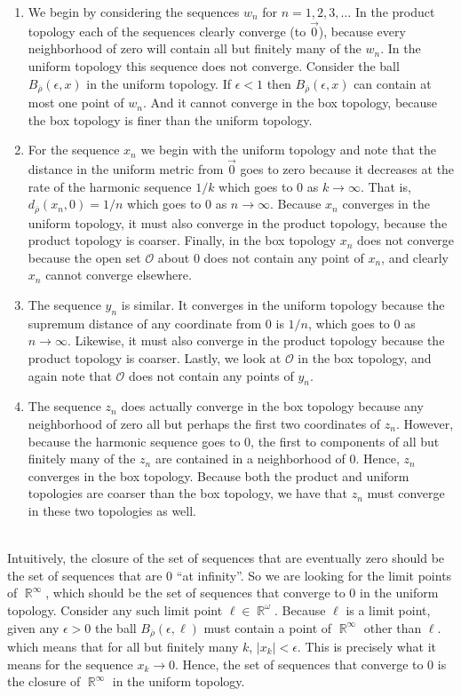 \documentclass{article}
\DeclareMathOperator{\R}{\mathbb{R}}
\newcommand{\problem}[1]{\noindent{\textbf{Problem #1}}\\}
\newcommand{\problempart}[1]{\noindent{\textbf{(#1)}}}
\begin{document}
\problempart{b} 
\begin{enumerate}
\item We begin by considering the sequences $w_n$ for $n = 1,2,3,\ldots$ In the product topology each of the sequences clearly converge (to $\vec{0}$), because every neighborhood of zero will contain all but finitely many of the $w_n$. In the uniform topology this sequence does not converge. Consider the ball $B_{\overline{\rho}}(\epsilon, x)$ in the uniform topology. If $\epsilon < 1$ then $B_{\overline{\rho}}(\epsilon, x)$ can contain at most one point of $w_n$. And it cannot converge in the box topology, because the box topology is finer than the uniform topology.
\item For the sequence $x_n$ we begin with the uniform topology and note that the distance in the uniform metric from $\vec{0}$ goes to zero because it decreases at the rate of the harmonic sequence $1/k$ which goes to 0 as $k \to \infty$. That is, $d_{\overline{\rho}}(x_n, 0) = 1/n$ which goes to 0 as $n \to \infty$. Because $x_n$ converges in the uniform topology, it must also converge in the product topology, because the product topology is coarser. Finally, in the box topology $x_n$ does not converge because the open set $\mathcal{O}$ about 0 does not contain any point of $x_n$, and clearly $x_n$ cannot converge elsewhere. 
\item The sequence $y_n$ is similar. It converges in the uniform topology because the supremum distance of any coordinate from $0$ is $1/n$, which goes to $0$ as $n \to \infty$. Likewise, it must also converge in the product topology because the product topology is coarser. Lastly, we look at $\mathcal{O}$ in the box topology, and again note that $\mathcal{O}$ does not contain any points of $y_n$.
\item The sequence $z_n$ does actually converge in the box topology because any neighborhood of zero all but perhaps the first two coordinates of $z_n$. However, because the harmonic sequence goes to 0, the first to components of all but finitely many of the $z_n$ are contained in a neighborhood of $0$. Hence, $z_n$ converges in the box topology. Because both the product and uniform topologies are coarser than the box topology, we have that $z_n$ must converge in these two topologies as well. 
\end{enumerate} 

\problem{2.20.5} 
\indent Intuitively, the closure of the set of sequences that are eventually zero should be the set of sequences that are 0 ``at infinity''. So we are looking for the limit points of $\R^\infty$, which should be the set of sequences that converge to 0 in the uniform topology. Consider any such limit point $\ell \in \R^\omega$. Because $\ell$ is a limit point, given any $\epsilon > 0$ the ball $B_{\overline{\rho}}(\epsilon, \ell)$ must contain a point of $\R^\infty$ other than $\ell$. which means that for all but finitely many $k$, $|x_k| < \epsilon$. This is precisely what it means for the sequence $x_k \to 0$. Hence, the set of sequences that converge to 0 is the closure of $\R^\infty$ in the uniform topology.   
\end{document}

